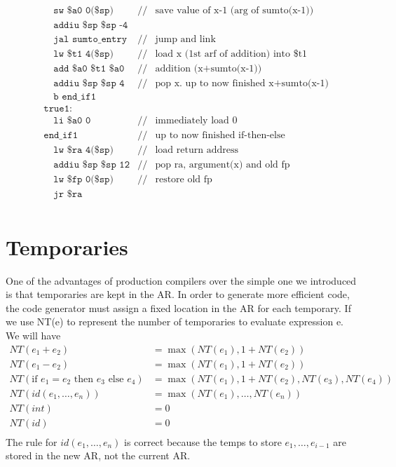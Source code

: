 \begin{align*}
&\quad\texttt{sw \$a0 0(\$sp)}&//&\text{save value of x-1 (arg of sumto(x-1))}\\
&\quad\texttt{addiu \$sp \$sp -4}\\
&\quad\texttt{jal sumto\_entry}&//&\text{jump and link}\\
&\quad\texttt{lw \$t1 4(\$sp)}&//&\text{load x (1st arf of addition) into \$t1}\\
&\quad\texttt{add \$a0 \$t1 \$a0}&//&\text{addition (x+sumto(x-1))}\\
&\quad\texttt{addiu \$sp \$sp 4}&//&\text{pop x. up to now finished x+sumto(x-1)}\\
&\quad\texttt{b end\_if1}&&\\
&\texttt{true1:}&&\\
&\quad\texttt{li \$a0 0}&//&\text{immediately load 0}\\
&\texttt{end\_if1}&//&\text{up to now finished if-then-else}\\
&\quad\texttt{lw \$ra 4(\$sp)}&//&\text{load return address}\\
&\quad\texttt{addiu \$sp \$sp 12}&//&\text{pop ra, argument(x) and old fp}\\
&\quad\texttt{lw \$fp 0(\$sp)}&//&\text{restore old fp}\\
&\quad\texttt{jr \$ra}&&\\
\end{align*}
\section{Temporaries}
One of the advantages of production compilers over the simple one we introduced is that temporaries are kept in the AR. In order to generate more efficient code, the code generator must assign a fixed location in the AR for each temporary. If we use NT(e) to represent the number of temporaries to evaluate expression e. We will have 
\begin{align*}
NT(e_1 + e_2)&=\max(NT(e_1), 1 + NT(e_2))\\
NT(e_1 - e_2)&=\max(NT(e_1), 1 + NT(e_2))\\
NT(\text{if }e_1 = e_2\text{ then }e_3\text{ else }e_4)&=\max(NT(e_1), 1 + NT(e_2), NT(e_3), NT(e_4))\\
NT(id(e_1,\dots,e_n))&=\max(NT(e_1),\dots,NT(e_n))\\
NT(int)&=0\\
NT(id)&=0\\
\end{align*}
The rule for $id(e_1,\dots,e_n)$ is correct because the temps to store $e_1,\dots,e_{i-1}$ are stored in the new AR, not the current AR. 

